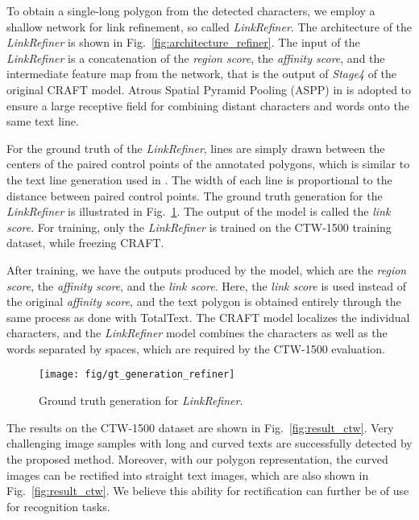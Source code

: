 \documentclass[10pt,twocolumn,letterpaper]{article}
\begin{document}
To obtain a single-long polygon from the detected characters, we employ a shallow network for link refinement,  so called \textit{LinkRefiner}. The architecture of the \textit{LinkRefiner} is shown in Fig.~\ref{fig:architecture_refiner}. The input of the \textit{LinkRefiner} is a concatenation of the \textit{region score}, the \textit{affinity score}, and the intermediate feature map from the network, that is the output of \textit{Stage4} of the original CRAFT model. Atrous Spatial Pyramid Pooling (ASPP) in \cite{chen2018deeplab} is adopted to ensure a large receptive field for combining distant characters and words onto the same text line.

For the ground truth of the \textit{LinkRefiner}, lines are simply drawn between the centers of the paired control points of the annotated polygons, which is similar to the text line generation used in \cite{he2016accurate}. The width of each line is proportional to the distance between paired control points. The ground truth generation for the \textit{LinkRefiner} is illustrated in Fig.~\ref{fig:gt_generation_refiner}. The output of the model is called the \textit{link score}. For training, only the \textit{LinkRefiner} is trained on the CTW-1500 training dataset, while freezing CRAFT.


After training, we have the outputs produced by the model, which are the \textit{region score}, the \textit{affinity score}, and the \textit{link score}. Here, the  \textit{link score} is used instead of the original \textit{affinity score}, and the text polygon is obtained entirely through the same process as done with TotalText. The CRAFT model localizes the individual characters, and the \textit{LinkRefiner} model combines the characters as well as the words separated by spaces, which are required by the CTW-1500 evaluation.

\begin{figure}[t]
	\begin{center}
        \texttt{[image: fig/gt\_generation\_refiner]}
        \caption{Ground truth generation for \textit{LinkRefiner}.}
  	    \label{fig:gt_generation_refiner} 
    \end{center}
    \vspace{-1.5mm}
\end{figure}


The results on the CTW-1500 dataset are shown in Fig.~\ref{fig:result_ctw}. Very challenging image samples with long and curved texts are successfully detected by the proposed method. Moreover, with our polygon representation, the curved images can be rectified into straight text images, which are also shown in Fig.~\ref{fig:result_ctw}. We believe this ability for rectification can further be of use for recognition tasks.
\end{document}
